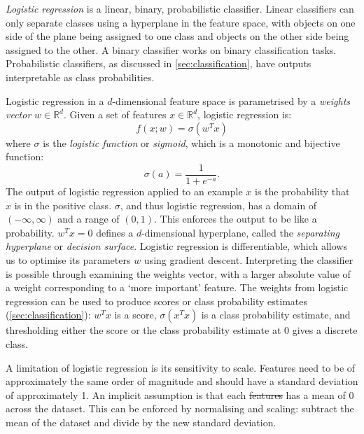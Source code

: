 \documentclass[11pt, a4paper]{book}
\newcommand{\defn}[1]{\emph{#1}}
\providecommand{\DIFaddtex}[1]{{\protect\color{blue}\uwave{#1}}} %
\providecommand{\DIFdeltex}[1]{{\protect\color{red}\sout{#1}}}                      %
\providecommand{\DIFaddbegin}{} %
\providecommand{\DIFaddend}{} %
\providecommand{\DIFdelbegin}{} %
\providecommand{\DIFdelend}{} %
\providecommand{\DIFadd}[1]{\texorpdfstring{\DIFaddtex{#1}}{#1}} %
\providecommand{\DIFdel}[1]{\texorpdfstring{\DIFdeltex{#1}}{}} %
\newcommand{\DIFscaledelfig}{0.5}
\newlength{\DIFdelgraphicswidth} %
\newlength{\DIFdelgraphicsheight} %
\newcommand{\DIFaddincludegraphics}[2][]{{\color{blue}\fbox{\DIFOincludegraphics[#1]{#2}}}} %
\newcommand{\DIFdelincludegraphics}[2][]{%
\sbox{\DIFdelgraphicsbox}{\DIFOincludegraphics[#1]{#2}}%
\settoboxwidth{\DIFdelgraphicswidth}{\DIFdelgraphicsbox} %
\settoboxtotalheight{\DIFdelgraphicsheight}{\DIFdelgraphicsbox} %
\scalebox{\DIFscaledelfig}{%
\parbox[b]{\DIFdelgraphicswidth}{\usebox{\DIFdelgraphicsbox}\\[-\baselineskip] \rule{\DIFdelgraphicswidth}{0em}}\llap{\resizebox{\DIFdelgraphicswidth}{\DIFdelgraphicsheight}{%
\setlength{\unitlength}{\DIFdelgraphicswidth}%
\begin{picture}(1,1)%
\thicklines\linethickness{2pt} %
{\color[rgb]{1,0,0}\put(0,0){\framebox(1,1){}}}%
{\color[rgb]{1,0,0}\put(0,0){\line( 1,1){1}}}%
{\color[rgb]{1,0,0}\put(0,1){\line(1,-1){1}}}%
\end{picture}%
}\hspace*{3pt}}} %
} %
\DeclareRobustCommand{\DIFaddbegin}{\DIFOaddbegin \let\includegraphics\DIFaddincludegraphics} %
\DeclareRobustCommand{\DIFaddend}{\DIFOaddend \let\includegraphics\DIFOincludegraphics} %
\DeclareRobustCommand{\DIFdelbegin}{\DIFOdelbegin \let\includegraphics\DIFdelincludegraphics} %
\DeclareRobustCommand{\DIFdelend}{\DIFOaddend \let\includegraphics\DIFOincludegraphics} %
\begin{document}
        \defn{Logistic regression} is a linear, binary, probabilistic classifier. Linear classifiers can only separate classes using a hyperplane in the feature space, with objects on one side of the plane being assigned to one class and objects on the other side being assigned to the other. A binary classifier works on binary classification tasks. Probabilistic classifiers, as discussed in \autoref{sec:classification}, have outputs interpretable as class probabilities.

        Logistic regression in a $d$-dimensional feature space is parametrised by a \defn{weights vector} $w \in \mathbb R^d$. Given a set of features $x \in \mathbb R^d$, logistic regression is:
        \begin{equation}
            \label{eq:logistic-regression}
            f(x; w) = \sigma(w^T x)
        \end{equation}
        where $\sigma$ is the \defn{logistic function} or \defn{sigmoid}, which is a monotonic and bijective function:
        \begin{equation}
            \label{eq:logistic-function}
            \sigma(a) = \frac{1}{1 + e^{-a}}.
        \end{equation}
        The output of logistic regression applied to an example $x$ is the probability that $x$ is in the positive class. $\sigma$, and thus logistic regression, has a domain of $(-\infty, \infty)$ and a range of $(0, 1)$. This enforces the output to be like a probability. $w^T x= 0$ defines a $d$-dimensional hyperplane, called the \defn{separating hyperplane} or \defn{decision surface}. Logistic regression is differentiable, which allows us to optimise its parameters $w$ using gradient descent. Interpreting the classifier is possible through examining the weights vector, with a larger absolute value of a weight corresponding to a `more important' feature. The weights from logistic regression can be used to produce scores or class probability estimates (\autoref{sec:classification}): $w^T x$ is a score, $\sigma(x^T x)$ is a class probability estimate, and thresholding either the score or the class probability estimate at $0$ gives a discrete class.

        A limitation of logistic regression is its sensitivity to scale. Features need to be of approximately the same order of magnitude and should have a standard deviation of approximately 1. An implicit assumption is that each \DIFdelbegin \DIFdel{features }\DIFdelend \DIFaddbegin \DIFadd{feature }\DIFaddend has a mean of 0 across the dataset. This can be enforced by normalising and scaling: subtract the mean of the dataset and divide by the new standard deviation.
\end{document}

